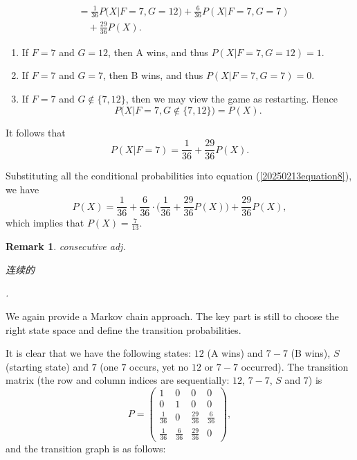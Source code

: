 \documentclass[12pt,letterpaper, onecolumn]{exam}
\newtheorem{remark}{Remark}
\begin{document}
\begin{questions}
\begin{solution}
\begin{enumerate}
\begin{align*}
                    &=\frac{1}{36}P\Big(X|F=7,G=12\Big)+\frac{6}{36}P(X|F=7,G=7)\\
                    &\quad +\frac{29}{36}P(X).
                \end{align*}
                \begin{enumerate}
                    \item If $F=7$ and $G=12$, then A wins, and thus $P(X|F=7,G=12)=1$.
                    \item If $F=7$ and $G=7$, then B wins, and thus $P(X|F=7,G=7)=0$.
                    \item If $F=7$ and $G\not\in\{7,12\}$, then we may view the game as restarting. Hence
                    $$P\Big(X|F=7,G\not\in\{7,12\}\Big)=P(X).$$
                \end{enumerate}
                It follows that 
                $$P(X|F=7)=\frac{1}{36}+\frac{29}{36}P(X).$$
            \end{enumerate}
            \quad Substituting all the conditional probabilities into equation (\ref{20250213equation8}), we have 
            $$P(X)=\frac{1}{36}+\frac{6}{36}\cdot\Big(\frac{1}{36}+\frac{29}{36}P(X)\Big)+\frac{29}{36}P(X),$$
            which implies that $P(X)=\frac{7}{13}$.
        \end{solution}
        \begin{remark}
            consecutive  adj. \begin{CJK}{UTF8}{gbsn}连续的\end{CJK}.
        \end{remark}
        \quad We again provide a Markov chain approach. The key part is still to choose the right state space and define the transition probabilities.
        \begin{solution}
            It is clear that we have the following states: $12$ (A wins) and $7-7$ (B wins), $S$ (starting state) and $7$ (one $7$ occurs, yet no $12$ or $7-7$ occurred). The transition matrix (the row and column indices are sequentially: $12$, $7-7$, $S$ and $7$) is 
            $$
            P=\begin{pmatrix}
                1&0&0&0\\
                0&1&0&0\\
                \frac{1}{36}&0&\frac{29}{36}&\frac{6}{36}\\
                \frac{1}{36}&\frac{6}{36}&\frac{29}{36}&0
            \end{pmatrix},
            $$
            and the transition graph is as follows:

\end{solution}
\end{questions}
\end{document}
